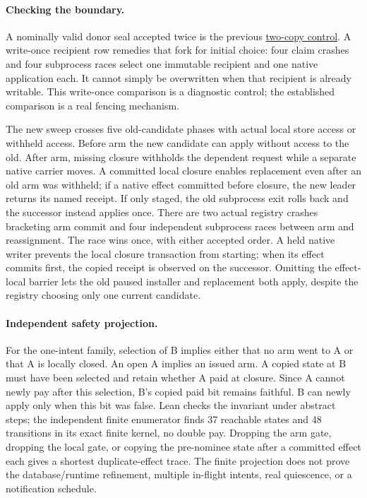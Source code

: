 \documentclass[11pt]{article}
\begin{document}
\paragraph{Checking the boundary.}
A nominally valid donor seal accepted twice is the previous
\href{https://github.com/eternal-november/eos-research-programmes/pull/742}
{two-copy control}. A write-once recipient row remedies that fork
for initial choice: four claim crashes and four subprocess races
select one immutable recipient and one native application each.
It cannot simply be overwritten when that recipient is already
writable. This write-once comparison is a diagnostic control;
the established comparison is a real fencing mechanism.

The new sweep crosses five old-candidate phases with actual local
store access or withheld access. Before arm the new candidate can
apply without access to the old. After arm, missing closure withholds
the dependent request while a separate native carrier moves. A
committed local closure enables replacement even after an old arm
was withheld; if a native effect committed before closure, the new
leader returns its named receipt. If only staged, the old subprocess
exit rolls back and the successor instead applies once. There are
two actual registry crashes bracketing arm commit and four independent
subprocess races between arm and reassignment. The race wins once,
with either accepted order. A held native writer prevents the local
closure transaction from starting; when its effect commits first,
the copied receipt is observed on the successor. Omitting the
effect-local barrier lets the old paused installer and replacement
both apply, despite the registry choosing only one current candidate.

\paragraph{Independent safety projection.}
For the one-intent family, selection of B implies either that no
arm went to A or that A is locally closed. An open A implies an
issued arm. A copied state at B must have been selected and retain
whether A paid at closure. Since A cannot newly pay after this
selection, B's copied paid bit remains faithful. B can newly apply
only when this bit was false. Lean checks the invariant under
abstract steps; the independent finite enumerator finds 37 reachable
states and 48 transitions in its exact finite kernel, no double pay.
Dropping the arm gate, dropping the local gate, or copying the
pre-nominee state after a committed effect each gives a shortest
duplicate-effect trace. The finite projection does not prove the
database/runtime refinement, multiple in-flight intents, real
quiescence, or a notification schedule.
\end{document}
